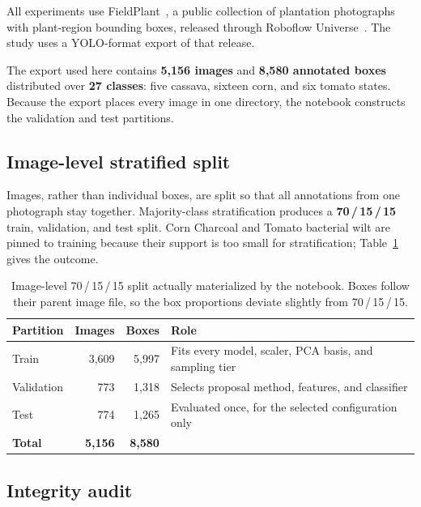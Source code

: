 \documentclass[a4paper,8pt]{article}
\begin{document}
All experiments use FieldPlant~\cite{fieldplant}, a public collection of plantation photographs
with plant-region bounding boxes, released through Roboflow Universe~\cite{roboflow}. The study
uses a YOLO-format export of that release.

The export used here contains \textbf{5{,}156 images} and \textbf{8{,}580 annotated boxes}
distributed over \textbf{27 classes}: five cassava, sixteen corn, and six tomato states. Because
the export places every image in one directory, the notebook constructs the validation and test
partitions.

\subsection{Image-level stratified split}

Images, rather than individual boxes, are split so that all annotations from one photograph stay
together. Majority-class stratification produces a \textbf{70\,/\,15\,/\,15} train,
validation, and test split. Corn Charcoal and Tomato bacterial wilt are pinned to training
because their support is too small for stratification; Table~\ref{tab:split} gives the outcome.

\begin{table}[H]
\centering
\small
\renewcommand{\arraystretch}{1.2}
\begin{tabularx}{0.82\textwidth}{|l|r|r|>{\raggedright\arraybackslash}X|}
\hline
\textbf{Partition} & \textbf{Images} & \textbf{Boxes} & \textbf{Role}\\
\hline
Train & 3{,}609 & 5{,}997 & Fits every model, scaler, PCA basis, and sampling tier\\
\hline
Validation & 773 & 1{,}318 & Selects proposal method, features, and classifier\\
\hline
Test & 774 & 1{,}265 & Evaluated once, for the selected configuration only\\
\hline
\textbf{Total} & \textbf{5{,}156} & \textbf{8{,}580} & \\
\hline
\end{tabularx}
\caption{Image-level 70\,/\,15\,/\,15 split actually materialized by the notebook. Boxes follow
their parent image file, so the box proportions deviate slightly from 70\,/\,15\,/\,15.}
\label{tab:split}
\end{table}

\subsection{Integrity audit}
\end{document}
